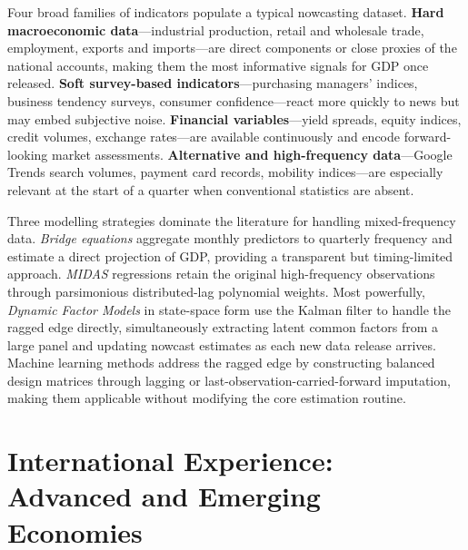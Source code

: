 \documentclass[12pt,a4paper]{report}
\begin{document}
Four broad families of indicators populate a typical nowcasting dataset.
\textbf{Hard macroeconomic data}---industrial production, retail and
wholesale trade, employment, exports and imports---are direct components
or close proxies of the national accounts, making them the most
informative signals for GDP once released. \textbf{Soft survey-based
indicators}---purchasing managers' indices, business tendency surveys,
consumer confidence---react more quickly to news but may embed
subjective noise. \textbf{Financial variables}---yield spreads, equity
indices, credit volumes, exchange rates---are available continuously and
encode forward-looking market assessments. \textbf{Alternative and
high-frequency data}---Google Trends search volumes, payment card
records, mobility indices---are especially relevant at the start of a
quarter when conventional statistics are absent.\citep{Peru2024,US2022}

Three modelling strategies dominate the literature for handling
mixed-frequency data. \textit{Bridge equations} aggregate monthly
predictors to quarterly frequency and estimate a direct projection of
GDP, providing a transparent but timing-limited approach.
\textit{MIDAS} regressions retain the original high-frequency
observations through parsimonious distributed-lag polynomial weights.
Most powerfully, \textit{Dynamic Factor Models} in state-space form use
the Kalman filter to handle the ragged edge directly, simultaneously
extracting latent common factors from a large panel and updating
nowcast estimates as each new data release arrives.\citep{Giannone2008}
Machine learning methods address the ragged edge by constructing
balanced design matrices through lagging or last-observation-carried-forward
imputation, making them applicable without modifying the core estimation
routine.

\section{International Experience: Advanced and Emerging Economies}
\end{document}
